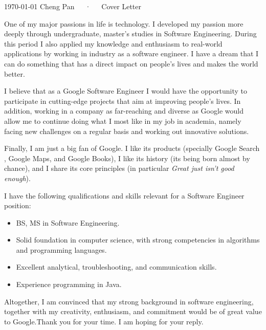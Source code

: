 \documentclass[11pt, a4paper]{awesome-cv}
\begin{document}
\makecvheader[R]

\makecvfooter
  {\today}
  {Cheng Pan~~~·~~~Cover Letter}
  {}

\makelettertitle

\begin{cvletter}

One of my major passions in life is technology. I developed my passion more deeply through undergraduate, master's studies in Software Engineering. During this period I also applied my knowledge and enthusiasm to real-world applications by working in industry as a software engineer. I have a dream that I can do something that has a direct impact on people's lives and makes the world better.

I believe that as a Google Software Engineer I would have the opportunity to participate in cutting-edge projects that aim at improving people's lives. In addition, working in a company as far-reaching and diverse as Google would allow me to continue doing what I most like in my job in academia, namely facing new challenges on a regular basis and working out innovative solutions.

Finally, I am just a big fan of Google. I like its products (specially Google Search , Google Maps, and Google Books), I like its history (its being born almost by chance), and I share its core principles (in particular \emph{Great just isn't good enough}).

I have the following qualifications and skills relevant for a Software Engineer position:

\begin{itemize}
	\item BS, MS in Software Engineering.
	\item Solid foundation in computer science, with strong competencies in algorithms and programming languages.
	\item Excellent analytical, troubleshooting, and communication skills.
	\item Experience programming in Java.
\end{itemize}

Altogether, I am convinced that my strong background in software engineering, together with my creativity, enthusiasm, and commitment would be of great value to Google.Thank you for your time. I am hoping for your reply.
\end{cvletter}


\makeletterclosing
\end{document}

